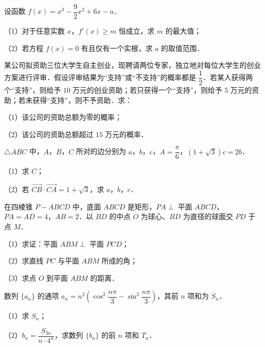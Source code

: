 \begin{question}
设函数 $f(x)=x^3-\dfrac92x^2+6x-a$．

（1）对于任意实数 $x$，$f'(x)\geqslant m$ 恒成立，求 $m$ 的最大值；

（2）若方程 $f(x)=0$ 有且仅有一个实根，求 $a$ 的取值范围．

\end{question}
\begin{question}
某公司拟资助三位大学生自主创业，现聘请两位专家，独立地对每位大学生的创业方案进行评审．假设评审结果为“支持”或“不支持”的概率都是 $\dfrac12$．若某人获得两个“支持”，则给予 $10$ 万元的创业资助；若只获得一个“支持”，则给予 $5$ 万元的资助；若未获得“支持”，则不予资助．求：

（1）该公司的资助总额为零的概率；

（2）该公司的资助总额超过 $15$ 万元的概率．

\end{question}
\begin{question}
$\triangle ABC$ 中，$A$，$B$，$C$ 所对的边分别为 $a$，$b$，$c$，$A=\dfrac{\pi}{6}$，$(1+\sqrt3)c=2b$．

（1）求 $C$；

（2）若 $\overrightarrow{CB}\cdot\overrightarrow{CA}=1+\sqrt3$，求 $a$，$b$，$c$．

\Needspace{0.4\textheight}
\end{question}
\begingroup
\renewenvironment{question}{\Needspace{0.5\textheight}}{}
\begin{question}
在四棱锥 $P-ABCD$ 中，底面 $ABCD$ 是矩形，$PA\perp$ 平面 $ABCD$，$PA=AD=4$，$AB=2$．以 $BD$ 的中点 $O$ 为球心、$BD$ 为直径的球面交 $PD$ 于点 $M$．

（1）求证：平面 $ABM\perp$ 平面 $PCD$；

（2）求直线 $PC$ 与平面 $ABM$ 所成的角；

（3）求点 $O$ 到平面 $ABM$ 的距离．
\nopagebreak[4]
\begin{center}\end{center}
\nopagebreak[4]
\end{question}
\endgroup
\begin{question}
数列 $\{a_n\}$ 的通项 $a_n=n^2\left(\cos^2\dfrac{n\pi}{3}-\sin^2\dfrac{n\pi}{3}\right)$，其前 $n$ 项和为 $S_n$．

（1）求 $S_n$；

（2）$b_n=\dfrac{S_{3n}}{n\cdot4^n}$，求数列 $\{b_n\}$ 的前 $n$ 项和 $T_n$．

\Needspace{0.4\textheight}
\end{question}
